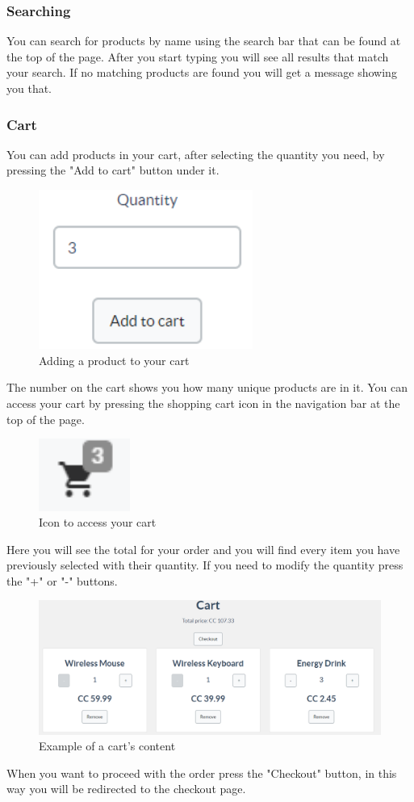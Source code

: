 		\subsubsection{Searching}
		You can search for products by name using the search bar that can be 
		found at the top of the page. After you start typing you will see 
		all results that match your search. If no matching products are found 
		you will get a message showing you that.
%		
		\subsubsection{Cart}
		You can add products in your cart, after selecting the quantity you 
		need, by pressing the "Add to cart" button under it.
		\begin{figure}[H]
			\includegraphics[width=7cm]{res/images/add_to_cart.png}
			\centering
			\caption{Adding a product to your cart}
		\end{figure}
		\noindent The number on the cart shows you how many unique products 
		are in it. You can access your cart by pressing the shopping cart icon 
		in the navigation bar at the top of the page.
		\begin{figure}[H]
			\includegraphics[width=3cm]{res/images/cart_icon.png}
			\centering
			\caption{Icon to access your cart}
		\end{figure}
		\noindent Here you will see the total for your order and you will find 
		every item you have previously selected with their quantity. If you 
		need to modify the quantity press the "+" or "-" buttons.
		\begin{figure}[H]
			\includegraphics[width=15cm]{res/images/cart_example.png}
			\centering
			\caption{Example of a cart's content}
		\end{figure}
		\noindent When you want to proceed with the order press the "Checkout" 
		button, in this way you will be redirected to the checkout page.
